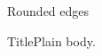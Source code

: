 \documentclass[8pt]{beamer}
\begin{document}
\begin{frame}[t]{Rounded edges}
\begin{block}{Title}Plain body.\end{block}
\end{frame}
\end{document}
